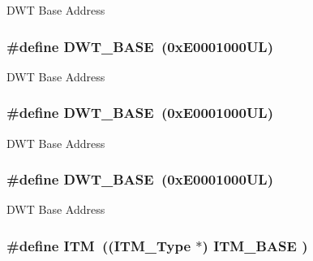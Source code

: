 D\-W\-T Base Address \hypertarget{group___c_m_s_i_s__core__base_gafdab534f961bf8935eb456cb7700dcd2}{
\subsubsection[{D\-W\-T\-\_\-\-B\-A\-S\-E}]{\setlength{\rightskip}{0pt plus 5cm}\#define D\-W\-T\-\_\-\-B\-A\-S\-E~(0x\-E0001000\-U\-L)}}\label{group___c_m_s_i_s__core__base_gafdab534f961bf8935eb456cb7700dcd2}
D\-W\-T Base Address \hypertarget{group___c_m_s_i_s__core__base_gafdab534f961bf8935eb456cb7700dcd2}{
\subsubsection[{D\-W\-T\-\_\-\-B\-A\-S\-E}]{\setlength{\rightskip}{0pt plus 5cm}\#define D\-W\-T\-\_\-\-B\-A\-S\-E~(0x\-E0001000\-U\-L)}}\label{group___c_m_s_i_s__core__base_gafdab534f961bf8935eb456cb7700dcd2}
D\-W\-T Base Address \hypertarget{group___c_m_s_i_s__core__base_gafdab534f961bf8935eb456cb7700dcd2}{
\subsubsection[{D\-W\-T\-\_\-\-B\-A\-S\-E}]{\setlength{\rightskip}{0pt plus 5cm}\#define D\-W\-T\-\_\-\-B\-A\-S\-E~(0x\-E0001000\-U\-L)}}\label{group___c_m_s_i_s__core__base_gafdab534f961bf8935eb456cb7700dcd2}
D\-W\-T Base Address \hypertarget{group___c_m_s_i_s__core__base_gabae7cdf882def602cb787bb039ff6a43}{
\subsubsection[{I\-T\-M}]{\setlength{\rightskip}{0pt plus 5cm}\#define I\-T\-M~(({\bf I\-T\-M\-\_\-\-Type}       $\ast$)     {\bf I\-T\-M\-\_\-\-B\-A\-S\-E}      )}}\label{group___c_m_s_i_s__core__base_gabae7cdf882def602cb787bb039ff6a43}
